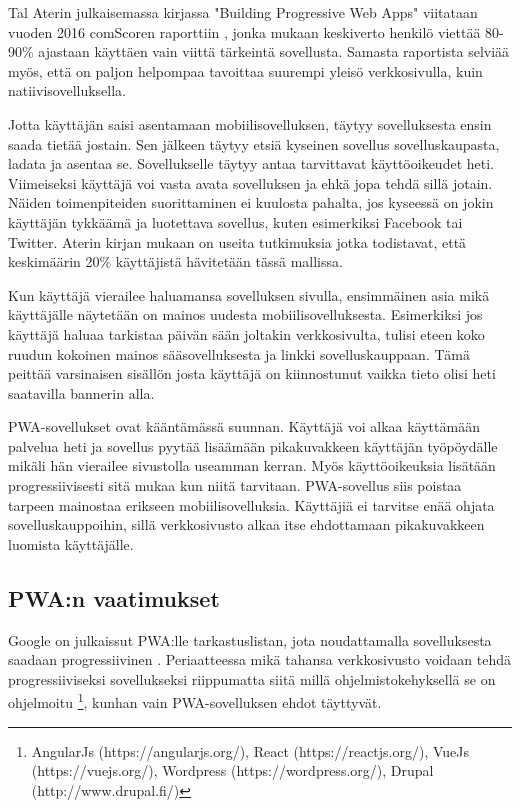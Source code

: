 \documentclass{tktltiki}
\begin{document}
Tal Aterin julkaisemassa kirjassa "Building Progressive Web Apps" \cite{ater2017building} viitataan vuoden 2016 comScoren raporttiin \cite{comScore}, jonka mukaan keskiverto henkilö viettää 80-90\% ajastaan käyttäen vain viittä tärkeintä sovellusta. Samasta raportista selviää myös, että on paljon helpompaa tavoittaa suurempi yleisö verkkosivulla, kuin natiivisovelluksella. 

Jotta käyttäjän saisi asentamaan mobiilisovelluksen, täytyy sovelluksesta ensin saada tietää jostain. Sen jälkeen täytyy etsiä kyseinen sovellus sovelluskaupasta, ladata ja asentaa se. Sovellukselle täytyy antaa tarvittavat käyttöoikeudet heti. Viimeiseksi käyttäjä voi vasta avata sovelluksen ja ehkä jopa tehdä sillä jotain. Näiden toimenpiteiden suorittaminen ei kuulosta pahalta, jos kyseessä on jokin käyttäjän tykkäämä ja luotettava sovellus, kuten esimerkiksi Facebook tai Twitter. Aterin kirjan mukaan \cite{ater2017building} on useita tutkimuksia jotka todistavat, että keskimäärin 20\% käyttäjistä hävitetään tässä mallissa. 

Kun käyttäjä vierailee haluamansa sovelluksen sivulla, ensimmäinen asia mikä käyttäjälle näytetään on mainos uudesta mobiilisovelluksesta. Esimerkiksi jos käyttäjä haluaa tarkistaa päivän sään joltakin verkkosivulta, tulisi eteen koko ruudun kokoinen mainos sääsovelluksesta ja linkki sovelluskauppaan. Tämä peittää varsinaisen sisällön josta käyttäjä on kiinnostunut vaikka tieto olisi heti saatavilla bannerin alla. 

PWA-sovellukset ovat kääntämässä suunnan. Käyttäjä voi alkaa käyttämään palvelua heti ja sovellus pyytää lisäämään pikakuvakkeen käyttäjän työpöydälle mikäli hän vierailee sivustolla useamman kerran. Myös käyttöoikeuksia lisätään progressiivisesti sitä mukaa kun niitä tarvitaan. PWA-sovellus siis poistaa tarpeen mainostaa erikseen mobiilisovelluksia. Käyttäjiä ei tarvitse enää ohjata sovelluskauppoihin, sillä verkkosivusto alkaa itse ehdottamaan pikakuvakkeen luomista käyttäjälle. 

\subsection{PWA:n vaatimukset}

Google on julkaissut PWA:lle tarkastuslistan, jota noudattamalla sovelluksesta saadaan progressiivinen \cite{Google}. Periaatteessa mikä tahansa verkkosivusto voidaan tehdä progressiiviseksi sovellukseksi \cite{hiltunen2018creating} riippumatta siitä millä ohjelmistokehyksellä se on ohjelmoitu \footnote[1]{AngularJs (https://angularjs.org/), React (https://reactjs.org/), VueJs (https://vuejs.org/), Wordpress (https://wordpress.org/), Drupal (http://www.drupal.fi/)}, kunhan vain PWA-sovelluksen ehdot täyttyvät.
\end{document}
